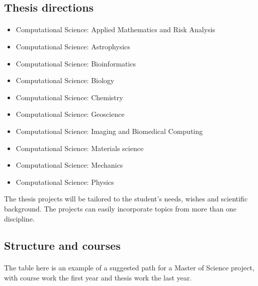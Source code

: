 \documentclass[%
oneside,                 %
final,                   %
10pt]{article}
\begin{document}
\subsection*{Thesis directions}

\paragraph{}

\begin{itemize}
\item Computational Science: Applied Mathematics and Risk Analysis

\item Computational Science: Astrophysics

\item Computational Science: Bioinformatics

\item Computational Science: Biology

\item Computational Science: Chemistry

\item Computational Science: Geoscience

\item Computational Science: Imaging and Biomedical Computing

\item Computational Science: Materials science

\item Computational Science: Mechanics

\item Computational Science: Physics
\end{itemize}

\noindent
The thesis projects will be tailored to the student's needs, wishes and scientific background. The projects can easily incorporate topics from more than one discipline.



\subsection*{Structure and courses}

\paragraph{}
The table here is an example of a suggested path for a Master of Science project,
with course work the first year and thesis work the last year.
\end{document}
